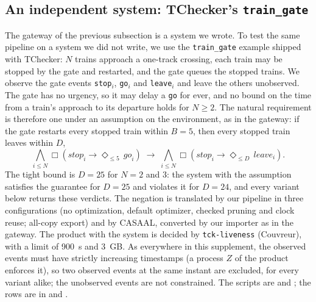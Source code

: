 \subsection{An independent system: TChecker's \texttt{train\_gate}}\label{sec:train-gate}
The gateway of the previous subsection is a system we wrote. To test the same pipeline on a system we did not write, we use the \texttt{train\_gate} example shipped with TChecker: $N$ trains approach a one-track crossing, each train may be stopped by the gate and restarted, and the gate queues the stopped trains. We observe the gate events \texttt{stop}$_i$, \texttt{go}$_i$ and \texttt{leave}$_i$ and leave the others unobserved. The gate has no urgency, so it may delay a \texttt{go} for ever, and no bound on the time from a train's approach to its departure holds for $N\geq 2$. The natural requirement is therefore one under an assumption on the environment, as in the gateway: if the gate restarts every stopped train within $B=5$, then every stopped train leaves within $D$,
\[\bigwedge_{i\leq N}\Box(\mathit{stop}_i\rightarrow\Diamond_{\leq 5}\,\mathit{go}_i)\;\rightarrow\;\bigwedge_{i\leq N}\Box(\mathit{stop}_i\rightarrow\Diamond_{\leq D}\,\mathit{leave}_i).\]
The tight bound is $D=25$ for $N=2$ and $3$: the system with the assumption satisfies the guarantee for $D=25$ and violates it for $D=24$, and every variant below returns these verdicts. The negation is translated by our pipeline in three configurations (no optimization, default optimizer, checked pruning and clock reuse; all-copy export) and by CASAAL, converted by our importer as in the gateway. The product with the system is decided by \texttt{tck-liveness} (Couvreur), with a limit of 900~s and 3~GB. As everywhere in this supplement, the observed events must have strictly increasing timestamps (a process $Z$ of the product enforces it), so two observed events at the same instant are excluded, for every variant alike; the unobserved events are not constrained. The scripts are  and ; the rows are in  and .

